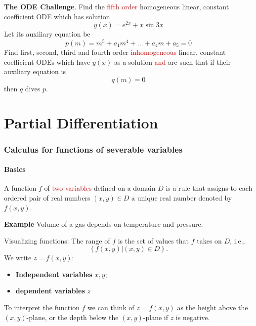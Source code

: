 \documentclass{article}
\begin{document}
\textbf{The ODE Challenge}. Find the \textcolor{red}{fifth order} homogeneous linear, constant coefficient ODE which has solution
$$
y(x) = e^{2x} + x\sin 3x
$$
Let its auxiliary equation be
$$
p(m) = m^5 + a_1 m^4 + \ldots + a_4 m + a_5=0
$$
Find first, second, third and fourth order \textcolor{red}{inhomogeneous} linear, constant coefficient ODEs which have $y(x)$ as a solution
\textcolor{red}{and} are such that if their auxiliary equation is
$$
q(m) = 0
$$
then $q$ dives $p$.
\vspace{3mm}


\newpage

\part{Partial Differentiation}

\section{Calculus for functions of severable variables}
\subsection{Basics}

A function $f$ of \textcolor{red}{two variables} defined on a domain $D$ is a rule that assigns to each ordered pair of real numbers
$(x,y) \in D$ a unique real number denoted by $f(x,y)$.

\textbf{Example} Volume of a gas depends on temperature and pressure.
\vspace{2mm}

Visualizing functions: The range of $f$ is the set of values that $f$ takes on $D$, i.e.,
$$
\left\{ f(x,y)|(x,y) \in D  \right\}.
$$
We write $z=f(x,y)$:
\begin{itemize}
\item
{\bf Independent variables} $x,y$; 
\item
{\bf dependent variables} $z $
\end{itemize}
To interpret the function $f$ we can think of $z=f(x,y)$ as the height above the $(x,y)$-plane, or the depth below
the $(x,y)$-plane if $z$ is negative.
\end{document}
